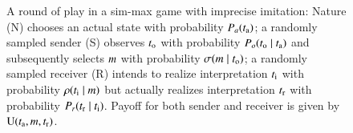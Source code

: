 \documentclass[fleqn,reqno,10pt]{article}
\newcommand{\similarity}{\ensuremath{\mathrm{Sim}}} %
\begin{document}
\begin{figure}
  \centering


  \caption{A round of play in a sim-max game with imprecise imitation: Nature (N) chooses an actual state with probability $P_a(t_{\mathrm{a}})$; a randomly sampled sender (S) observes $t_{\mathrm{o}}$ with probability $P_o(t_{\mathrm{o}} \mid t_{\mathrm{a}})$ and subsequently selects $m$ with probability $\sigma(m \mid t_{\mathrm{o}})$; a randomly sampled receiver (R) intends to realize interpretation $t_{\mathrm{i}}$ with probability $\rho(t_{\mathrm{i}} \mid m)$ but actually realizes interpretation $t_{\mathrm{r}}$ with probability $P_r(t_{\mathrm{r}} \mid t_{\mathrm{i}})$. Payoff for both sender and receiver is given by $\mathrm{U}(t_{\mathrm{a}}, m, t_{\mathrm{r}})$.}
  \label{fig:imprecise-sim-max-illustration}
\end{figure}
\end{document}
